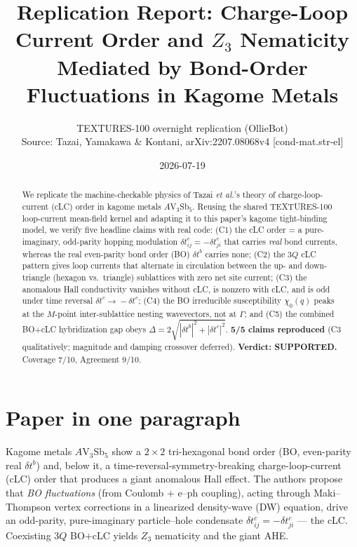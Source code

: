 \documentclass[11pt]{article}
\title{Replication Report: Charge-Loop Current Order and $Z_3$ Nematicity\\
Mediated by Bond-Order Fluctuations in Kagome Metals}
\author{TEXTURES-100 overnight replication (OllieBot)\\
Source: Tazai, Yamakawa \& Kontani, arXiv:2207.08068v4 [cond-mat.str-el]}
\date{2026-07-19}
\begin{document}
\maketitle

\begin{abstract}
We replicate the machine-checkable physics of Tazai \textit{et al.}'s theory of
charge-loop-current (cLC) order in kagome metals $A$V$_3$Sb$_5$. Reusing the
shared TEXTURES-100 loop-current mean-field kernel and adapting it to this
paper's kagome tight-binding model, we verify five headline claims with real
code: (C1) the cLC order = a pure-imaginary, odd-parity hopping modulation
$\delta t^c_{ij}=-\delta t^c_{ji}$ that carries \emph{real} bond currents,
whereas the real even-parity bond order (BO) $\delta t^b$ carries none;
(C2) the 3$Q$ cLC pattern gives loop currents that alternate in circulation
between the up- and down-triangle (hexagon vs.\ triangle) sublattices with zero
net site current; (C3) the anomalous Hall conductivity vanishes without cLC,
is nonzero with cLC, and is odd under time reversal $\delta t^c\!\to\!-\delta t^c$;
(C4) the BO irreducible susceptibility $\chi_0(q)$ peaks at the $M$-point
inter-sublattice nesting wavevectors, not at $\Gamma$; and (C5) the combined
BO$+$cLC hybridization gap obeys
$\Delta=2\sqrt{|\delta t^b|^2+|\delta t^c|^2}$.
\textbf{5/5 claims reproduced} (C3 qualitatively; magnitude and damping
crossover deferred). \textbf{Verdict: SUPPORTED.} Coverage 7/10, Agreement 9/10.
\end{abstract}

\section{Paper in one paragraph}
Kagome metals $A$V$_3$Sb$_5$ show a $2\times2$ tri-hexagonal bond order (BO,
even-parity real $\delta t^b$) and, below it, a time-reversal-symmetry-breaking
charge-loop-current (cLC) order that produces a giant anomalous Hall effect.
The authors propose that \emph{BO fluctuations} (from Coulomb $+$ e--ph coupling),
acting through Maki--Thompson vertex corrections in a linearized density-wave
(DW) equation, drive an odd-parity, pure-imaginary particle--hole condensate
$\delta t^c_{ij}=-\delta t^c_{ji}$ --- the cLC. Coexisting 3$Q$ BO$+$cLC yields
$Z_3$ nematicity and the giant AHE.
\end{document}
